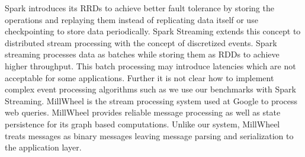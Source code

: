 Spark \cite{zaharia2010spark} introduces its RRDs \cite{zaharia2012resilient} to achieve better fault tolerance by storing the operations and replaying them instead of replicating data itself or use checkpointing to store data periodically. Spark Streaming \cite{zaharia2013discretized} extends this concept to distributed stream processing with the concept of discretized events. Spark streaming \cite{zaharia2013discretized} processes data as batches while storing them as RDDs \cite{zaharia2012resilient} to achieve higher throughput. This batch processing may introduce latencies which are not acceptable for some applications. Further it is not clear how to implement complex event processing algorithms such as we use our benchmarks with Spark Streaming. MillWheel \cite{akidau2013millwheel} is the stream processing system used at Google to process web queries. MillWheel \cite{akidau2013millwheel} provides reliable message processing as well as state persistence for its graph based computations. Unlike our system, MillWheel treats messages as binary messages leaving message parsing and serialization to the application layer. 

